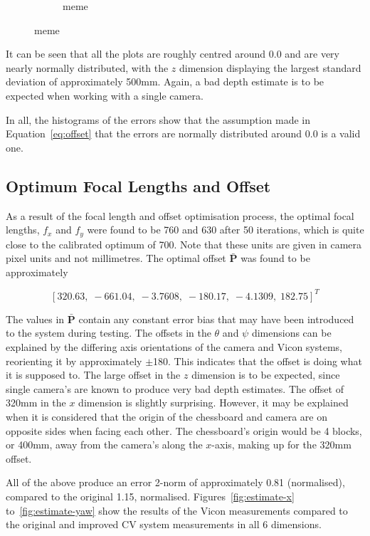 \begin{figure}
\begin{subfigure}{0.45\textwidth}
     \caption{meme}
  \label{fig:norm-yaw}
  \end{subfigure}
  \caption{meme}
  \label{fig:err-norm}
\end{figure}

It can be seen that all the plots are roughly centred around 0.0 and are very nearly normally distributed, with the $z$ dimension displaying the largest standard deviation of approximately 500mm. Again, a bad depth estimate is to be expected when working with a single camera.

In all, the histograms of the errors show that the assumption made in Equation~\ref{eq:offset} that the errors are normally distributed around 0.0 is a valid one. 

\subsection{Optimum Focal Lengths and Offset}

As a result of the focal length and offset optimisation process, the optimal focal lengths, $f_x$ and $f_y$ were found to be 760 and 630 after 50 iterations, which is quite close to the calibrated optimum of 700. Note that these units are given in camera pixel units and not millimetres. The optimal offset $\bar{\bm{P}}$ was found to be approximately

\[
  {[320.63,\;-661.04,\;-3.7608,\;-180.17,\;-4.1309,\;182.75]}^T
\]

The values in $\bar{\bm{P}}$ contain any constant error bias that may have been introduced to the system during testing. The offsets in the $\theta$ and $\psi$ dimensions can be explained by the differing axis orientations of the camera and Vicon systems, reorienting it by approximately $\pm$180\degree. This indicates that the offset is doing what it is supposed to. The large offset in the $z$ dimension is to be expected, since single camera's are known to produce very bad depth estimates. The offset of 320mm in the $x$ dimension is slightly surprising. However, it may be explained when it is considered that the origin of the chessboard and camera are on opposite sides when facing each other. The chessboard's origin would be 4 blocks, or 400mm, away from the camera's along the $x$-axis, making up for the 320mm offset.

All of the above produce an error 2-norm of approximately 0.81 (normalised), compared to the original 1.15, normalised. Figures~\ref{fig:estimate-x} to~\ref{fig:estimate-yaw} show the results of the Vicon measurements compared to the original and improved CV system measurements in all 6 dimensions.


